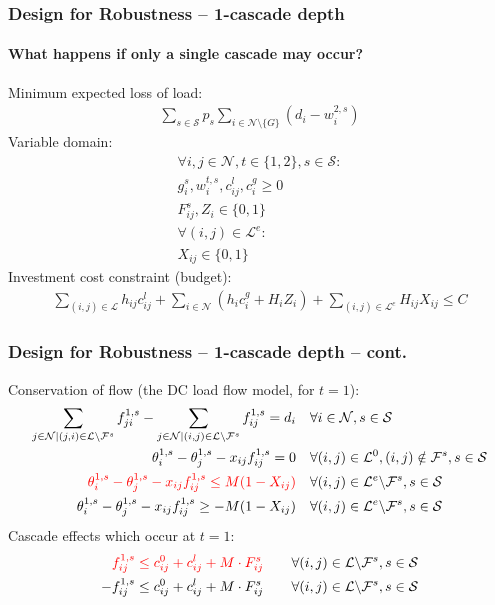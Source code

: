 \documentclass{beamer}
\begin{document}
\begin{frame}
\frametitle{Design for Robustness -- 1-cascade depth}
\framesubtitle{What happens if only a single cascade may occur?}
\vspace{0.1in}
Minimum expected loss of load:
\begin{align*}
\sum_{s\in\mathcal{S}}{p_s}\sum_{i\in\mathcal{N}\setminus\{G\}}{\left(d_i-w_i^{2,s}\right)}	
\end{align*}
\footnotesize
Variable domain:
\begin{align*}
	 \forall i,j\in\mathcal{N}, t\in\{1,2\}, s\in\mathcal{S}:\\
	 g_i^s, w_i^{t,s}, c_{ij}^l, c_i^g\geq0\\
	 F_{ij}^s, Z_i\in\{0,1\}\\
	 \forall (i,j)\in\mathcal{L}^e:\\
	 X_{ij} \in\{0,1\}
\end{align*}
Investment cost constraint (budget):
\begin{align*}
	 \sum_{(i,j)\in\mathcal{L}}{h_{ij}c_{ij}^l} + \sum_{i\in\mathcal{N}}\left(h_ic_i^g + H_iZ_i\right) + \sum_{(i,j)\in\mathcal{L}^e}{H_{ij}X_{ij}} \leq C
\end{align*}
\end{frame}
\begin{frame}
\frametitle{Design for Robustness -- 1-cascade depth -- cont.}\footnotesize
Conservation of flow (the DC load flow model, for $t=1$):
\begin{align*}
   \sum_{j\in\mathcal{N}|(j,i)\in\mathcal{L}\backslash\mathcal{F}^s}f_{ji}^{1,s}-\sum_{j\in\mathcal{N}|(i,j)\in\mathcal{L}\backslash\mathcal{F}^s}f_{ij}^{1,s} = d_i & \quad \forall i\in\mathcal{N}, s\in\mathcal{S}\\
	 \theta_i^{1,s}-\theta_j^{1,s}-x_{ij}f_{ij}^{1,s}=0 & \quad \forall (i,j)\in\mathcal{L}^0, (i,j)\notin\mathcal{F}^s, s\in\mathcal{S}\\
	 \color{red}{\theta_i^{1,s}-\theta_j^{1,s}-x_{ij}f_{ij}^{1,s}\leq M (1-X_{ij})} & \quad \forall (i,j)\in\mathcal{L}^e\backslash\mathcal{F}^s, s\in\mathcal{S}\\
	 \theta_i^{1,s}-\theta_j^{1,s}-x_{ij}f_{ij}^{1,s}\geq -M (1-X_{ij}) & \quad \forall (i,j)\in\mathcal{L}^e\backslash\mathcal{F}^s,  s\in\mathcal{S}
\end{align*}
Cascade effects which occur at $t=1$:
\begin{align*}
	\color{red}{f_{ij}^{1,s} \leq c_{ij}^0+c_{ij}^l + M\cdot F_{ij}^s} & \qquad \forall (i,j)\in\mathcal{L}\backslash\mathcal{F}^s, s\in\mathcal{S}\\
	 -f_{ij}^{1,s} \leq c_{ij}^0+c_{ij}^l + M\cdot F_{ij}^s & \qquad \forall (i,j)\in\mathcal{L}\backslash\mathcal{F}^s, s\in\mathcal{S}
\end{align*}
\end{frame}
\end{document}
